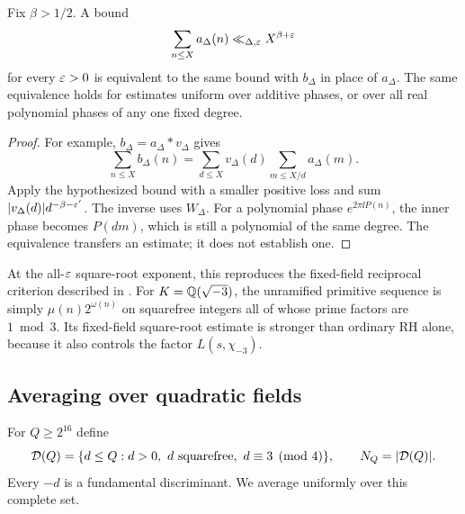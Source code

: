 \begin{corollary}\label{cor:primitive-power}
Fix $\beta>1/2$. A bound
\[
 \sum_{n\le X}a_\Delta(n)\ll_{\Delta,\varepsilon}X^{\beta+\varepsilon}
\]
for every $\varepsilon>0$ is equivalent to the same bound with $b_\Delta$ in place of $a_\Delta$. The same equivalence holds for estimates uniform over additive phases, or over all real polynomial phases of any one fixed degree.
\end{corollary}
\begin{proof}
For example, $b_\Delta=a_\Delta*v_\Delta$ gives
\[
 \sum_{n\le X}b_\Delta(n)
 =\sum_{d\le X}v_\Delta(d)\sum_{m\le X/d}a_\Delta(m).
\]
Apply the hypothesized bound with a smaller positive loss and sum $\lvert v_\Delta(d)\rvert d^{-\beta-\varepsilon'}$. The inverse uses $W_\Delta$. For a polynomial phase $e^{2\pi\ii P(n)}$, the inner phase becomes $P(dm)$, which is still a polynomial of the same degree. The equivalence transfers an estimate; it does not establish one.
\end{proof}

At the all-$\varepsilon$ square-root exponent, this reproduces the fixed-field reciprocal criterion described in \cite{R996}. For $K=\mathbb Q(\sqrt{-3})$, the unramified primitive sequence is simply $\mu(n)2^{\omega(n)}$ on squarefree integers all of whose prime factors are $1\bmod3$. Its fixed-field square-root estimate is stronger than ordinary RH alone, because it also controls the factor $L(s,\chi_{-3})$.

\subsection{Averaging over quadratic fields}
For $Q\ge2^{16}$ define
\[
 \mathcal D(Q)=\{d\le Q:d>0,\ d\text{ squarefree},\ d\equiv3\pmod4\},
 \qquad N_Q=\abs{\mathcal D(Q)}.
\]
Every $-d$ is a fundamental discriminant. We average uniformly over this complete set.

